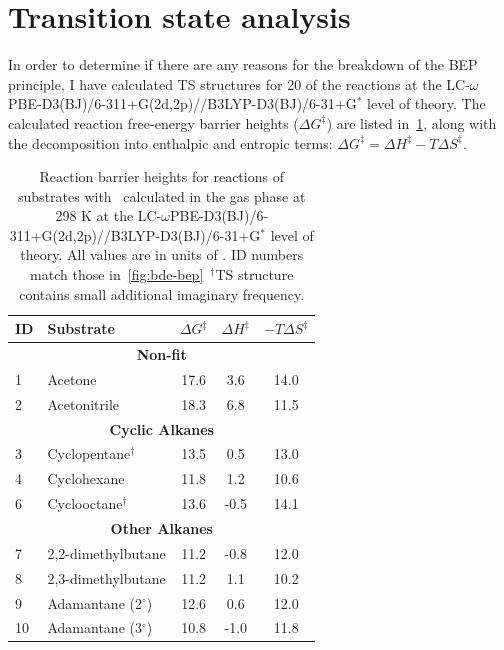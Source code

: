 \newpage
\section{Transition state analysis}

In order to determine if there are any reasons for the breakdown of the BEP principle, I have calculated TS structures for 20 of the reactions at the LC-$\omega$PBE-D3(BJ)/6-311+G(2d,2p)//B3LYP-D3(BJ)/6-31+G$^*$ level of theory. The calculated reaction free-energy barrier heights ($\Delta G^\ddagger$) are listed in~\ref{tab:ts-bep}, along with the decomposition into enthalpic and entropic terms: $\Delta G^\ddagger = \Delta H^\ddagger - T\Delta S^\ddagger$.

\begin{table}[!htbp]
  \caption[Reaction barrier heights for reactions of substrates with \cumo\ calculated in the gas phase at 298 K.]{Reaction barrier heights for reactions of substrates with \cumo\ calculated in the gas phase at 298 K at the LC-$\omega$PBE-D3(BJ)/6-311+G(2d,2p)//B3LYP-D3(BJ)/6-31+G$^*$ level of theory. All values are in units of \kcalmol. ID numbers match those in~\protect\ref{fig:bde-bep}\ $^\dagger$TS structure contains small additional imaginary frequency.}
  \label{tab:ts-bep}
  \begin{tabular}{l l c c c}
    ID & Substrate & $\Delta G^\ddagger$ & $\Delta H^\ddagger$ & $-T\Delta S^\ddagger$ \\
    \hline
    \multicolumn{5}{c}{\textbf{Non-fit}}\\
    1 & Acetone & 17.6 & 3.6 & 14.0 \\
    2 & Acetonitrile & 18.3 & 6.8 & 11.5 \\
    \hline
    \multicolumn{5}{c}{\textbf{ Cyclic Alkanes}}\\
    3 & Cyclopentane$^\dagger$ & 13.5 & 0.5 & 13.0 \\
    4 & Cyclohexane & 11.8 & 1.2 & 10.6 \\
    6 & Cyclooctane$^\dagger$ & 13.6 & -0.5 & 14.1 \\
    \hline
    \multicolumn{5}{c}{\textbf{Other Alkanes}}\\
    7 & 2,2-dimethylbutane & 11.2 & -0.8 & 12.0 \\
    8 & 2,3-dimethylbutane & 11.2 & 1.1 & 10.2 \\
    9 & Adamantane (2$^\circ$) & 12.6 & 0.6 & 12.0 \\
    10 & Adamantane (3$^\circ$) & 10.8 & -1.0 & 11.8 \\
    \hline

\end{tabular}
\end{table}
